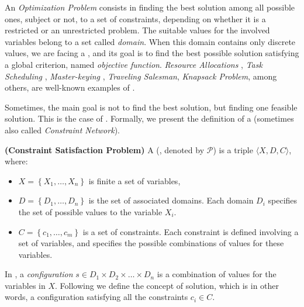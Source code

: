 An \textit{Optimization Problem} consists in finding the best solution among all possible ones, subject or not, to a set of constraints, depending on whether it is a restricted or an unrestricted problem. The suitable values for the involved variables belong to a set called {\it domain}. When this domain contains only discrete values, we are facing a \COP, and its goal is to find the best possible solution satisfying a global criterion, named {\it objective function}. {\it Resource Allocations} \cite{Akplogan2011}, \textit{Task Scheduling} \cite{Sibbesen2008}, \textit{Master-keying} \cite{Espelage2000}, \textit{Traveling Salesman}, \textit{Knapsack Problem}, among others, are well-known examples of \COPs{} \cite{Smith2005}.

Sometimes, the main goal is not to find the best solution, but finding one feasible solution. This is the case of \CSPs. Formally, we present the definition of a \csp{} (sometimes also called \textit{Constraint Network}). 

\begin{definition}{\bf (Constraint Satisfaction Problem)}
\label{def:csp}
A \CSP{} (\csp, denoted by $\mathcal{P}$) is a triple $\langle X,D,C \rangle$, where:
\begin{itemize}
\item $X = \left\{X_1,\ldots,X_n\right\}$ is finite a set of variables,
\item $D = \left\{D_1,\ldots, D_n\right\}$ is the set of associated domains. Each domain $D_i$ specifies the set of possible values to the variable $X_i$. %
\item $C = \left\{c_1,\ldots, c_m\right\}$ is a set of constraints. Each constraint is defined involving a set of variables, and specifies the possible combinations of values for these variables.
\end{itemize}
\end{definition}


In \csps, a \textit{configuration} $s\in D_1\times D_2\times\dots\times D_n$ is a combination of values for the variables in $X$. Following we define the concept of solution, which is in other words, a configuration satisfying all the constraints $c_i \in C$.

